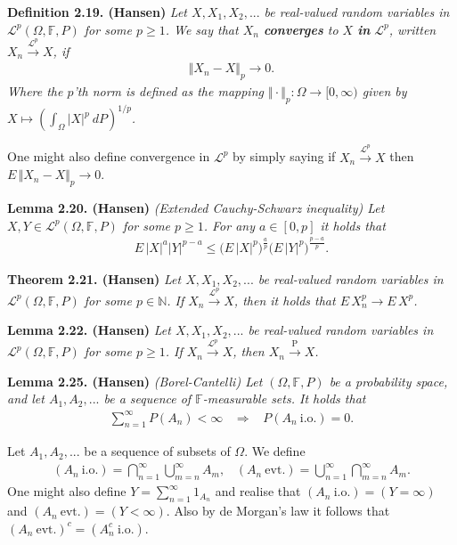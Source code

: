 \documentclass[a4paper,12pt,openany]{book}
\begin{document}
\textbf{Definition 2.19. (Hansen)} \emph{Let \(X,X_1,X_2,...\) be real-valued random variables in \(\mathcal{L}^p(\Omega,\mathbb{F},P)\) for some \(p\ge 1\). We say that \(X_n\) \textbf{converges} to \(X\) \textbf{in} \(\mathcal{L}^p\), written \(X_n\stackrel{\mathcal{L}^p}{\to} X\), if}
\begin{align*}
    \Vert X_n - X\Vert_p\to 0.\tag{2.27}
\end{align*}
\emph{Where the \(p\)'th norm is defined as the mapping \(\Vert \cdot \Vert_p : \Omega\to [0,\infty)\) given by \(X\mapsto \left(\int_\Omega \vert X\vert ^p\ dP\right)^{1/p}\).}

One might also define convergence in \(\mathcal{L}^p\) by simply saying if \(X_n\stackrel{\mathcal{L}^p}{\to} X\) then \(E\,\Vert X_n-X\Vert_p\to 0\).

\textbf{Lemma 2.20. (Hansen)} \emph{(Extended Cauchy-Schwarz inequality) Let \(X,Y\in\mathcal{L}^p(\Omega,\mathbb{F},P)\) for some \(p\ge 1\). For any \(a\in[0,p]\) it holds that}
\begin{align*}
    E\, \vert X\vert^a\vert Y\vert^{p-a}\le \Big(E\, \vert X\vert^p\Big)^{\frac{a}{p}}\Big(E\, \vert Y\vert^p\Big)^{\frac{p-a}{p}}.\tag{2.29}
\end{align*}

\textbf{Theorem 2.21. (Hansen)} \emph{Let \(X,X_1,X_2,...\) be real-valued random variables in \(\mathcal{L}^p(\Omega,\mathbb{F},P)\) for some \(p\in\mathbb{N}\). If \(X_n\stackrel{\mathcal{L}^p}{\to} X\), then it holds that \(E\, X_n^p\to E\, X^p\).}

\textbf{Lemma 2.22. (Hansen)} \emph{Let \(X,X_1,X_2,...\) be real-valued random variables in \(\mathcal{L}^p(\Omega,\mathbb{F},P)\) for some \(p\ge 1\). If \(X_n\stackrel{\mathcal{L}^p}{\to} X\), then \(X_n\stackrel{\text{P}}{\to} X\).}

\textbf{Lemma 2.25. (Hansen)} \emph{(Borel-Cantelli) Let \((\Omega,\mathbb{F},P)\) be a probability space, and let \(A_1,A_2,...\) be a sequence of \(\mathbb{F}\)-measurable sets. It holds that}
\begin{align*}
    \sum_{n=1}^\infty P(A_n)<\infty\hspace{10pt}\Rightarrow\hspace{10pt}P(A_n\ \text{i.o.})=0.
\end{align*}

Let \(A_1,A_2,...\) be a sequence of subsets of \(\Omega\). We define
\begin{align*}
    (A_n\ \text{i.o.})=\bigcap_{n=1}^\infty\bigcup_{m=n}^\infty A_m,\hspace{10pt}(A_n\ \text{evt.})=\bigcup_{n=1}^\infty\bigcap_{m=n}^\infty A_m.
\end{align*}
One might also define \(Y=\sum_{n=1}^\infty 1_{A_n}\) and realise that \((A_n\ \text{i.o.})=(Y=\infty)\) and \((A_n\ \text{evt.})=(Y<\infty)\). Also by de Morgan's law it follows that \((A_n\ \text{evt.})^c=(A_n^c\ \text{i.o.})\).
\end{document}
